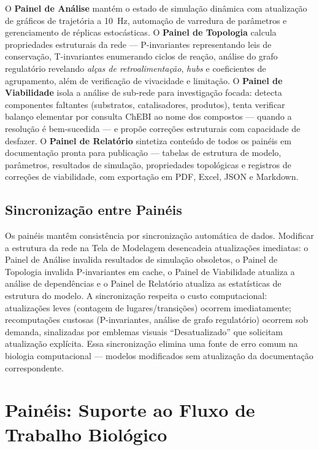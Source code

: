O \textbf{Painel de Análise} mantém o estado de simulação dinâmica com
atualização de gráficos de trajetória a 10~Hz, automação de varredura de
parâmetros e gerenciamento de réplicas estocásticas.
O \textbf{Painel de Topologia} calcula propriedades estruturais da rede —
P-invariantes representando leis de conservação, T-invariantes enumerando ciclos
de reação, análise do grafo regulatório revelando \textit{alças de retroalimentação},
\textit{hubs} e coeficientes de agrupamento, além de verificação de
vivacidade e limitação.
O \textbf{Painel de Viabilidade} isola a análise de sub-rede para investigação
focada: detecta componentes faltantes (substratos, catalisadores, produtos),
tenta verificar balanço elementar por consulta ChEBI ao nome dos compostos
--- quando a resolução é bem-sucedida --- e propõe correções estruturais
com capacidade de desfazer.
O \textbf{Painel de Relatório} sintetiza conteúdo de todos os painéis em
documentação pronta para publicação — tabelas de estrutura de modelo,
parâmetros, resultados de simulação, propriedades topológicas e registros de
correções de viabilidade, com exportação em PDF, Excel, JSON e Markdown.

\subsection{Sincronização entre Painéis}

Os painéis mantêm consistência por sincronização automática de dados.
Modificar a estrutura da rede na Tela de Modelagem desencadeia atualizações
imediatas: o Painel de Análise invalida resultados de simulação obsoletos, o
Painel de Topologia invalida P-invariantes em cache, o Painel de Viabilidade
atualiza a análise de dependências e o Painel de Relatório atualiza as
estatísticas de estrutura do modelo.
A sincronização respeita o custo computacional: atualizações leves (contagem de
lugares/transições) ocorrem imediatamente; recomputações custosas (P-invariantes,
análise de grafo regulatório) ocorrem sob demanda, sinalizadas por emblemas
visuais ``Desatualizado'' que solicitam atualização explícita.
Essa sincronização elimina uma fonte de erro comum na biologia computacional —
modelos modificados sem atualização da documentação correspondente.

\section{Painéis: Suporte ao Fluxo de Trabalho Biológico}
\label{sec:paineis}

